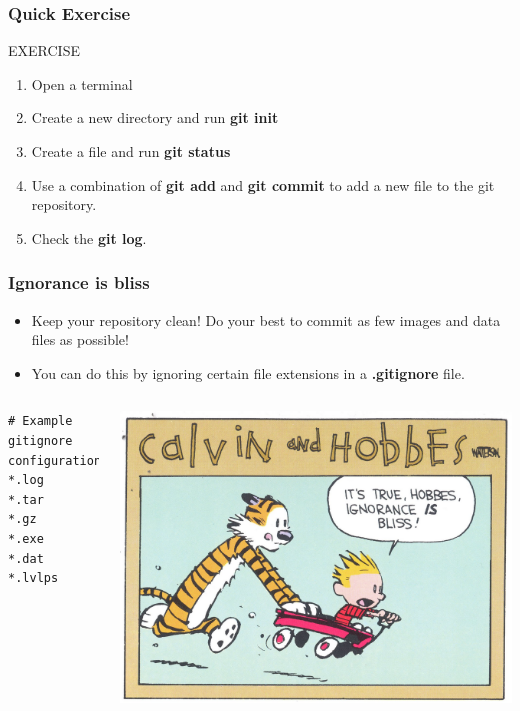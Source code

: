 \documentclass{beamer}
\begin{document}
\begin{frame}[fragile]
\frametitle{Quick Exercise}
    \begin{block}{EXERCISE}
        \begin{enumerate}
        \item Open a terminal
        \item Create a new directory and run \textbf{git init}
        \item Create a file and run \textbf{git status}
        \item Use a combination of \textbf{git add} and \textbf{git commit} to add a new file to the git repository.
        \item Check the \textbf{git log}.
        \end{enumerate}
    \end{block}

\end{frame}

\begin{frame}[fragile]
\frametitle{Ignorance is bliss}

\begin{itemize}
\item Keep your repository clean! Do your best to commit as few images and data files as possible!
\item You can do this by ignoring certain file extensions in a \textbf{.gitignore} file.
\end{itemize}
\begin{columns}
\begin{lstlisting}
# Example gitignore configuration
*.log
*.tar
*.gz
*.exe
*.dat
*.lvlps
\end{lstlisting}
\includegraphics[width=\textwidth]{IIB.jpg}
\end{columns}
\end{frame}
\end{document}
